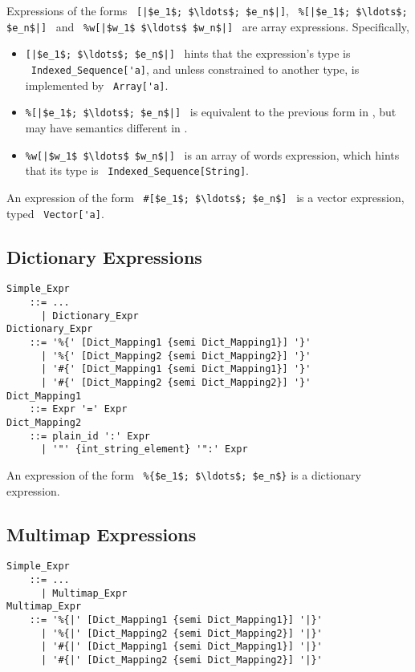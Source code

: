 Expressions of the forms ~\lstinline![|$e_1$; $\ldots$; $e_n$|]!, ~\lstinline!%[|$e_1$; $\ldots$; $e_n$|]!~ and ~\lstinline!%w[|$w_1$ $\ldots$ $w_n$|]!~ are array expressions. Specifically,
\begin{itemize}
  \item \lstinline![|$e_1$; $\ldots$; $e_n$|]!~ hints that the expression's type is ~\lstinline!Indexed_Sequence['a]!, and unless constrained to another type, is implemented by ~\lstinline!Array['a]!.
  \item \lstinline!%[|$e_1$; $\ldots$; $e_n$|]!~ is equivalent to the previous form in \AmlCore, but may have semantics different in \AmlSystem. %
  \item \lstinline!%w[|$w_1$ $\ldots$ $w_n$|]!~ is an array of words expression, which hints that its type is ~\lstinline!Indexed_Sequence[String]!. 
\end{itemize}

An expression of the form ~\lstinline!#[$e_1$; $\ldots$; $e_n$]!~ is a vector expression, typed ~\lstinline!Vector['a]!.





\subsection{Dictionary Expressions}
\label{sec:dict-expressions}

\grammar\begin{lstlisting}
Simple_Expr 
    ::= ...
      | Dictionary_Expr
Dictionary_Expr 
    ::= '%{' [Dict_Mapping1 {semi Dict_Mapping1}] '}'
      | '%{' [Dict_Mapping2 {semi Dict_Mapping2}] '}'
      | '#{' [Dict_Mapping1 {semi Dict_Mapping1}] '}'
      | '#{' [Dict_Mapping2 {semi Dict_Mapping2}] '}'
Dict_Mapping1
    ::= Expr '=' Expr
Dict_Mapping2 
    ::= plain_id ':' Expr
      | '"' {int_string_element} '":' Expr
\end{lstlisting}

An expression of the form ~\lstinline!%{$e_1$; $\ldots$; $e_n$}! is a dictionary expression. 





\subsection{Multimap Expressions}
\label{sec:multimap-expressions}

\grammar\begin{lstlisting}
Simple_Expr 
    ::= ...
      | Multimap_Expr
Multimap_Expr 
    ::= '%{|' [Dict_Mapping1 {semi Dict_Mapping1}] '|}'
      | '%{|' [Dict_Mapping2 {semi Dict_Mapping2}] '|}'
      | '#{|' [Dict_Mapping1 {semi Dict_Mapping1}] '|}'
      | '#{|' [Dict_Mapping2 {semi Dict_Mapping2}] '|}'
\end{lstlisting}

